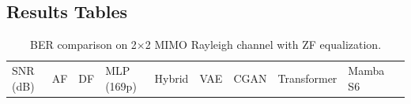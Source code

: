 \documentclass[
  english,
  12pt,
  12pt,
  a4paper,
  oneside]{report}
\begin{document}
\subsection{Results Tables}\label{sec:results-tables-1}

\begin{longtable}[]{@{}
  >{\raggedright\arraybackslash}p{}
  >{\raggedright\arraybackslash}p{}
  >{\raggedright\arraybackslash}p{}
  >{\raggedright\arraybackslash}p{}
  >{\raggedright\arraybackslash}p{}
  >{\raggedright\arraybackslash}p{}
  >{\raggedright\arraybackslash}p{}
  >{\raggedright\arraybackslash}p{}
  >{\raggedright\arraybackslash}p{}
  >{\raggedright\arraybackslash}p{}@{}}
\caption{BER comparison on 2×2 MIMO Rayleigh channel with ZF equalization.}\label{tbl:table4}\tabularnewline
\toprule\noalign{}
\begin{minipage}[b]{\linewidth}\raggedright
SNR (dB)
\end{minipage} & \begin{minipage}[b]{\linewidth}\raggedright
AF
\end{minipage} & \begin{minipage}[b]{\linewidth}\raggedright
DF
\end{minipage} & \begin{minipage}[b]{\linewidth}\raggedright
MLP (169p)
\end{minipage} & \begin{minipage}[b]{\linewidth}\raggedright
Hybrid
\end{minipage} & \begin{minipage}[b]{\linewidth}\raggedright
VAE
\end{minipage} & \begin{minipage}[b]{\linewidth}\raggedright
CGAN
\end{minipage} & \begin{minipage}[b]{\linewidth}\raggedright
Transformer
\end{minipage} & \begin{minipage}[b]{\linewidth}\raggedright
Mamba S6
\end{minipage} & \begin{minipage}[b]{\linewidth}\raggedright

\end{minipage}
\end{longtable}
\end{document}
